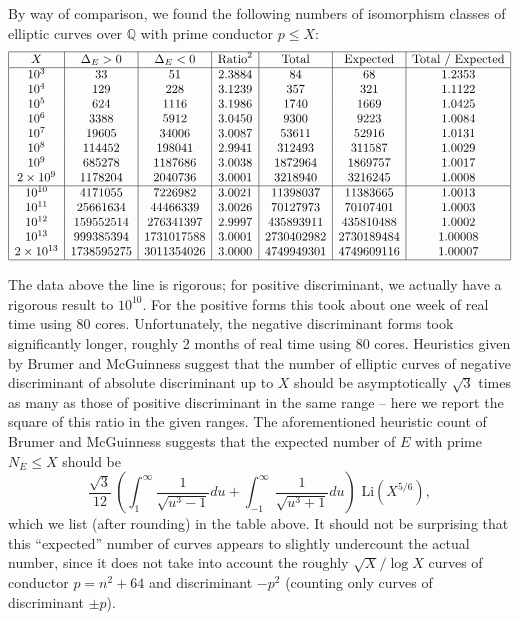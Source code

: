 By way of comparison, we found the following numbers of isomorphism classes of
elliptic curves  over $\mathbb{Q}$ with prime conductor $p \leq X$:
 $$
 \begin{array}{|c|c|c|c|c|c|c|} \hline
 X    & \Delta_E > 0  &   \Delta_E < 0 & \mbox{Ratio}^2 &  \mbox{Total}  & \mbox{Expected} & \mbox{Total / Expected} \\ 
\hline
10^3 &  33 &  51 &  2.3884 &  84 &  68 & 1.2353 \\
10^4 &  129 &  228 &  3.1239 &  357 &  321 & 1.1122 \\
10^5 &  624 &  1116 &  3.1986 &  1740 &  1669 & 1.0425 \\
10^6 &  3388 &  5912 &  3.0450 &  9300 &  9223 & 1.0084 \\
10^7 &  19605 &  34006 &  3.0087 &  53611 &  52916 & 1.0131\\
10^8 &  114452 &  198041 &  2.9941 &  312493 &  311587 & 1.0029\\
10^9 &  685278 &  1187686 &  3.0038 &  1872964 &  1869757 & 1.0017 \\
2\times10^9 &  1178204 &  2040736 &  3.0001 &  3218940 &  3216245 & 1.0008\\
\hline
10^{10} &  4171055 &  7226982 &  3.0021 &  11398037 &  11383665 & 1.0013\\
10^{11} &  25661634 &  44466339 &  3.0026 &  70127973 &  70107401 & 1.0003\\
10^{12} &  159552514 &  276341397 &  2.9997 &  435893911 &  435810488 & 1.0002\\
10^{13} &  999385394 &  1731017588 &  3.0001 &  2730402982 &  2730189484 & 1.00008 \\
2\times10^{13} &  1738595275 &  3011354026 &  3.0000 &  4749949301 &  4749609116 & 1.00007 \\
\hline
\end{array}
$$


The data above the line is rigorous; for positive discriminant, we actually have a rigorous 
result to $10^{10}$. For the positive forms this took about one week of real time using 80 cores. 
Unfortunately, the negative discriminant forms took significantly longer, roughly 2 months of real time using 80 cores. 
Heuristics given by Brumer and McGuinness \cite{BrMc} suggest that the number of elliptic curves of negative 
discriminant of absolute discriminant up to $X$ should be asymptotically $\sqrt{3}$ times as many as those of positive 
discriminant in the same range -- here we report the square of this ratio in the given ranges. The aforementioned 
heuristic count of Brumer and McGuinness suggests that the 
expected number of $E$ with prime $N_E \leq X$ 
should be 
  $$
  \frac{\sqrt{3}}{12} \, \left( \int_{1}^{\infty} \frac{1}{\sqrt{u^3-1}} du + \int_{-1}^{\infty} \frac{1}{\sqrt{u^3+1}} du  \right) \mbox{ Li} (X^{5/6}),
  $$
  which we list (after rounding) in the table above. It should not be surprising that this ``expected'' number of curves appears to slightly undercount the actual number, since it does not take into account the roughly $\sqrt{X}/\log X$ curves of conductor $p=n^2+64$ and discriminant $-p^2$ (counting only curves of discriminant $\pm p$).

